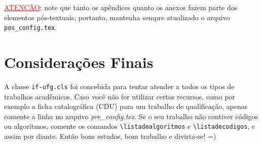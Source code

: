 \vspace{20pt}
\noindent
\textcolor{red}{\uline{ATENÇÃO}}: note que tanto os apêndices quanto os anexos fazem parte dos elementos pós-textuais, portanto, mantenha sempre atualizado o arquivo \texttt{pos\_config.tex}.

\section{Considerações Finais}

A classe \texttt{if-ufg.cls} foi concebida para tentar atender a todos os tipos de trabalhos acadêmicos. Caso você não for utilizar certos recursos, como por exemplo a ficha catalográfica (CDU) para um trabalho de qualificação, apenas comente a linha no arquivo \emph{pre\_config.tex}. Se o seu trabalho não contiver códigos ou algoritmos, comente os comandos \Verb+\listadealgoritmos+ e \Verb+\listadecodigos+, e assim por diante. Então bons estudos, bom trabalho e divirta-se! =)